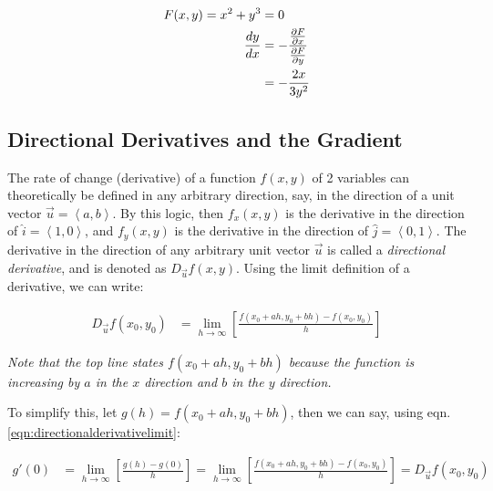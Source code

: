 \documentclass[12pt]{article}
\begin{document}
\begin{equation}
    \begin{split}
        F(x,y) = x^2 + y^3 &= 0\\
        \frac{dy}{dx} &= -\frac{\frac{\partial F}{\partial x}}{\frac{\partial F}{\partial y}}\\
        &= -\frac{2x}{3y^2}\\
    \end{split}
\end{equation}
\subsection{Directional Derivatives and the Gradient}

The rate of change (derivative) of a function $f(x,y)$ of 2 variables can theoretically be defined in any arbitrary direction, say, in the direction of a unit vector $\vec{u} = \left\langle a,b\right\rangle$. By this logic, then $f_x(x,y)$ is the derivative in the direction of $\hat{i} = \left\langle 1, 0 \right\rangle$, and $f_y(x,y)$ is the derivative in the direction of $\hat{j} = \left\langle 0, 1 \right\rangle$. The derivative in the direction of any arbitrary unit vector $\vec{u}$ is called a \textit{directional derivative}, and is denoted as $D_{\vec{u}}f(x,y)$. Using the limit definition of a derivative, we can write:

\begin{equation}\label{eqn:directionalderivativelimit}
    \begin{split}
        D_{\vec{u}}f(x_0,y_0) &= \lim_{h\to\infty}[\frac{f(x_0+ah,y_0+bh)-f(x_0,y_0)}{h}]
    \end{split}
\end{equation}

\textit{Note that the top line states $f(x_0+ah,y_0+bh)$ because the function is increasing by $a$ in the $x$ direction and $b$ in the $y$ direction.}

To simplify this, let $g(h) = f(x_0+ah,y_0+bh)$, then we can say, using eqn. \ref{eqn:directionalderivativelimit}:

\begin{equation}
    \begin{split}
        g'(0) &= \lim_{h\to\infty}[\frac{g(h)-g(0)}{h}] = \lim_{h\to\infty}[\frac{f(x_0+ah,y_0+bh)-f(x_0,y_0)}{h}] = D_{\vec{u}}f(x_0,y_0)\\
    \end{split}
\end{equation}
\end{document}
